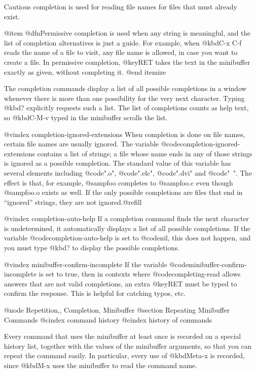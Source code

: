 {{Cautious completion is used for reading file names for files that must
already exist.

@item
@dfn{Permissive} completion is used when any string is
meaningful, and the list of completion alternatives is just a guide.
For example, when @kbd{C-x C-f} reads the name of a file to visit, any
file name is allowed, in case you want to create a file.  In
permissive completion, @key{RET} takes the text in the minibuffer
exactly as given, without completing it.
@end itemize

  The completion commands display a list of all possible completions in a
window whenever there is more than one possibility for the very next
character.  Typing @kbd{?} explicitly requests such a list.  The
list of completions counts as help text, so @kbd{C-M-v} typed in the
minibuffer scrolls the list.

@vindex completion-ignored-extensions
  When completion is done on file names, certain file names are usually
ignored.  The variable @code{completion-ignored-extensions} contains a list
of strings; a file whose name ends in any of those strings is ignored as a
possible completion.  The standard value of this variable has several
elements including @code{".o"}, @code{".elc"}, @code{".dvi"} and @code{"~"}.
The effect is that, for example, @samp{foo} completes to @samp{foo.c}
even though @samp{foo.o} exists as well.  If the only possible completions
are files that end in ``ignored'' strings, they are not ignored.@refill

@vindex completion-auto-help
  If a completion command finds the next character is undetermined, it
automatically displays a list of all possible completions.  If the variable
@code{completion-auto-help} is set to @code{nil}, this does not happen,
and you must type @kbd{?} to display the possible completions.

@vindex minibuffer-confirm-incomplete
If the variable @code{minibuffer-confirm-incomplete} is set to true,
then in contexts where @code{completing-read} allows answers that are
not valid completions, an extra @key{RET} must be typed to confirm the
response.  This is helpful for catching typos, etc.

@node Repetition,, Completion, Minibuffer
@section Repeating Minibuffer Commands
@cindex command history
@cindex history of commands

  Every command that uses the minibuffer at least once is recorded on a
special history list, together with the values of the minibuffer arguments,
so that you can repeat the command easily.  In particular, every
use of @kbd{Meta-x} is recorded, since @kbd{M-x} uses the minibuffer to
read the command name.

}}
